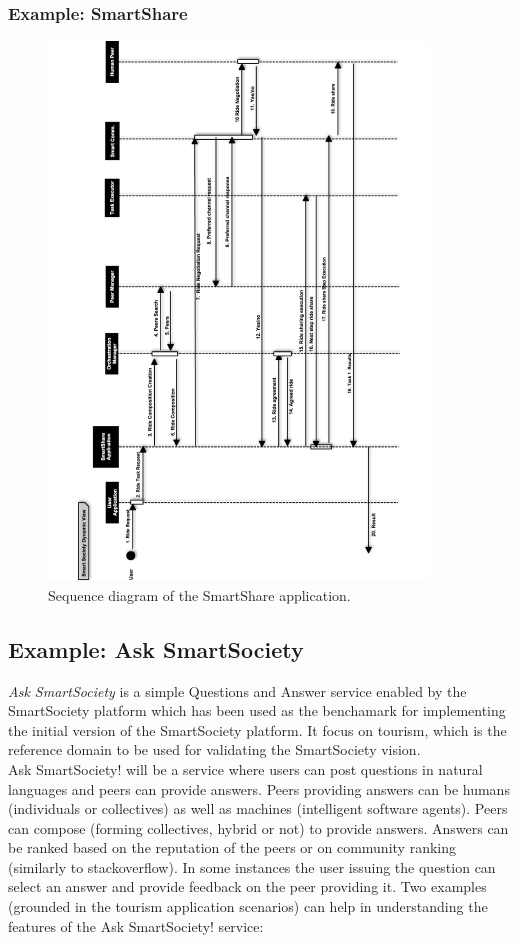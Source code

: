 \subsubsection{Example: SmartShare}
\begin{figure}
\centering
\includegraphics[width=0.9\textwidth]{./figs/sequenceRide}
\caption{Sequence diagram of the SmartShare application.}
\label{fig:dynamic_share}
\end{figure}

\subsection{Example: Ask SmartSociety}\label{sec:asksmartsoc}
\textit{Ask SmartSociety} is a simple Questions and Answer service enabled by the SmartSociety platform which has been used as the benchamark for implementing the initial version of the SmartSociety platform. It focus on tourism, which is the reference domain to be used for validating the SmartSociety vision.\\
Ask SmartSociety! will be a service where users can post questions in natural languages and peers can provide answers. Peers providing answers can be humans (individuals or collectives) as well as machines (intelligent software agents). Peers can compose (forming collectives, hybrid or not) to provide answers. Answers can be ranked based on the reputation of the peers or on community ranking (similarly to stackoverflow). In some instances the user issuing the question can select an answer and provide feedback on the peer providing it.
Two examples (grounded in the tourism application scenarios) can help in understanding the features of the Ask SmartSociety! service:

